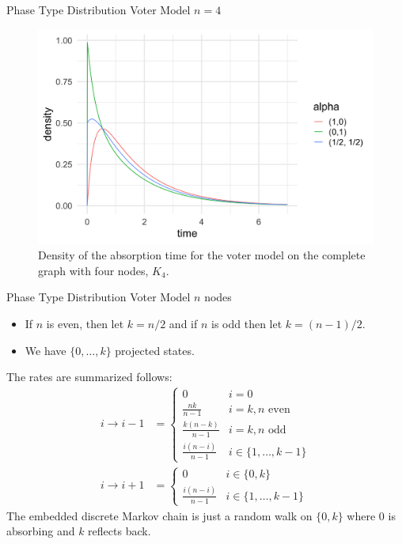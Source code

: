 \documentclass{beamer}
\theoremstyle{definition}
\begin{document}
\begin{frame}{Phase Type Distribution Voter Model $n = 4$}
    \begin{figure}[H]
  \centering
    \includegraphics[width=.9\textwidth]{figures/voter_density_c4.png}
   \caption{Density of the absorption time for the voter model on the complete graph with four nodes, $K_4$.}
  \label{fig:voter_density_c4}
\end{figure}
\end{frame}

\begin{frame}{Phase Type Distribution Voter Model $n$ nodes}
    \begin{itemize}
        \item If $n$ is even, then let $k = n / 2$ and if $n$ is odd then let $k = (n - 1)/2$.
        \item We have $\{0,\ldots, k\}$ projected states.
    \end{itemize}

The rates are summarized follows:
\begin{align*}
    i \to i - 1 &= \begin{cases}
        0 & i = 0\\
        \frac{nk}{n - 1}  & i = k, n \text{ even}\\
        \frac{k (n - k)}{n - 1} & i = k, n \text{ odd}\\
        \frac{i (n - i)}{n - 1}  & i \in \{1,\ldots, k - 1\}
    \end{cases}\\
    i \to i + 1 &= \begin{cases}
        0 & i \in \{0, k\}\\
        \frac{i (n - i)}{n - 1}  & i \in \{1,\ldots, k - 1\}
    \end{cases}
\end{align*}
The embedded discrete Markov chain is just a random walk on $\{0, k\}$ where 0 is absorbing and $k$ reflects back.
\end{frame}
\end{document}
